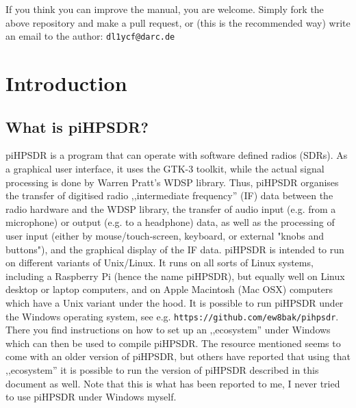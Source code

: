 \documentclass[12pt]{book}
\def\pH{pi\-HPSDR\xspace}
\begin{document}
If you think you can improve the manual, you are welcome.
Simply fork the above repository and make a pull request, or (this is the recommended way) write an
email to the author: \texttt{dl1ycf@darc.de}
\tableofcontents
\mainmatter
\chapter{Introduction}
\section{What is \pH?}
\pH is a program that can operate with software defined radios (SDRs). As a graphical user interface,
it uses the GTK-3 toolkit, while the actual signal processing is done by Warren Pratt's WDSP library. Thus,
\pH organises the transfer of digitised radio ,,intermediate frequency'' (IF)
data between the radio hardware and the
WDSP library, the
transfer of audio input (e.g. from a microphone) or output (e.g. to a headphone) data,
as well as the processing of user
input (either by mouse/touch-screen, keyboard, or external "knobs and buttons"),
and the graphical display of the IF data. \pH is intended
to run on different variants of Unix/Linux. It runs on all sorts of Linux systems,
including a Raspberry Pi (hence
the name \pH), but equally well on Linux desktop or laptop computers, and on Apple Macintosh (Mac OSX)
computers which have a Unix variant under the hood.
It is possible to run
\pH under the Windows operating system, see e.g. \texttt{https://github.com/ew8bak/pihpsdr}.
There you find instructions on how to set up an ,,ecosystem'' under Windows which can then be used to compile
\pH. The resource mentioned seems to come with an older version of \pH, but others have reported
that using that ,,ecosystem'' it is possible to run the version of \pH described in this document
as well. Note that this is what has been reported to me, I never tried to use \pH under Windows
myself.
\end{document}
